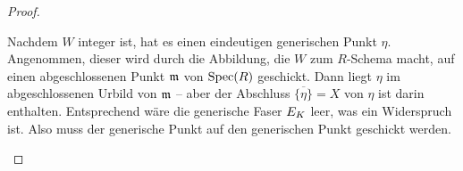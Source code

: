\begin{Lemma}
\begin{proof}
\begin{description}
      Nachdem $W$ integer ist, hat es einen eindeutigen generischen
      Punkt $\eta$.
      Angenommen, dieser wird durch die Abbildung, die $W$ zum
      $R$-Schema macht, auf einen abgeschlossenen Punkt $\mathfrak{m}$ von $\operatorname{Spec}(R)$
      geschickt.
      Dann liegt $\eta$ im abgeschlossenen Urbild von $\mathfrak{m}$ –
      aber der Abschluss $\overline{\{\eta\}}=X$ von $\eta$ ist darin
      enthalten. Entsprechend wäre die generische Faser $E_{K}$
      leer, was ein Widerspruch ist.
      Also muss der generische Punkt auf den generischen Punkt geschickt
      werden.
      \qedhere
    \end{description}
  \end{proof}
\end{Lemma}





